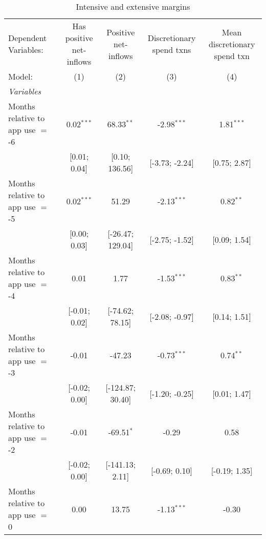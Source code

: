 
\begin{table}[htbp]
   \centering
   \tiny
   \begin{threeparttable}[b]
      \caption{\label{tab:intext} Intensive and extensive margins}
      \begin{tabular}{lcccc}
         \tabularnewline \midrule \midrule
         Dependent Variables:              & Has positive net-inflows & Positive net-inflows & Discretionary spend txns & Mean discretionary spend txn\\  
         Model:                            & (1)                      & (2)                  & (3)                      & (4)\\  
         \midrule
         \emph{Variables}\\
         Months relative to app use $=$ -6 & 0.02$^{***}$             & 68.33$^{**}$         & -2.98$^{***}$            & 1.81$^{***}$\\   
                                           & [0.01; 0.04]             & [0.10; 136.56]       & [-3.73; -2.24]           & [0.75; 2.87]\\   
         Months relative to app use $=$ -5 & 0.02$^{***}$             & 51.29                & -2.13$^{***}$            & 0.82$^{**}$\\   
                                           & [0.00; 0.03]             & [-26.47; 129.04]     & [-2.75; -1.52]           & [0.09; 1.54]\\   
         Months relative to app use $=$ -4 & 0.01                     & 1.77                 & -1.53$^{***}$            & 0.83$^{**}$\\   
                                           & [-0.01; 0.02]            & [-74.62; 78.15]      & [-2.08; -0.97]           & [0.14; 1.51]\\   
         Months relative to app use $=$ -3 & -0.01                    & -47.23               & -0.73$^{***}$            & 0.74$^{**}$\\   
                                           & [-0.02; 0.00]            & [-124.87; 30.40]     & [-1.20; -0.25]           & [0.01; 1.47]\\   
         Months relative to app use $=$ -2 & -0.01                    & -69.51$^{*}$         & -0.29                    & 0.58\\   
                                           & [-0.02; 0.00]            & [-141.13; 2.11]      & [-0.69; 0.10]            & [-0.19; 1.35]\\   
         Months relative to app use $=$ 0  & 0.00                     & 13.75                & -1.13$^{***}$            & -0.30\\   

\end{tabular}
\end{threeparttable}
\end{table}
